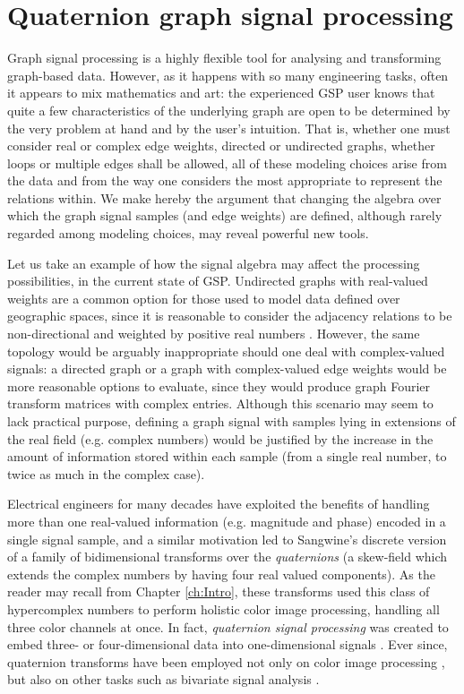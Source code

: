 \chapter{Quaternion graph signal processing}
\label{ch:QGSP}

Graph signal processing is a highly flexible tool for analysing and transforming graph-based data. However, as it happens with so many engineering tasks, often it appears to mix mathematics and art: the experienced GSP user knows that quite a few characteristics of the underlying graph are open to be determined by the very problem at hand and by the user's intuition. That is, whether one must consider real or complex edge weights, directed or undirected graphs, whether loops or multiple edges shall be allowed, all of these modeling choices arise from the data and from the way one considers the most appropriate to represent the relations within. We make hereby the argument that changing the algebra over which the graph signal samples (and edge weights) are defined, although rarely regarded among modeling choices, may reveal powerful new tools.

Let us take an example of how the signal algebra may affect the processing possibilities, in the current state of GSP. Undirected graphs with real-valued weights are a common option for those used to model data defined over geographic spaces, since it is reasonable to consider the adjacency relations to be non-directional and weighted by positive real numbers \cite{shuman2013emerging}. However, the same topology would be arguably inappropriate should one deal with complex-valued signals: a directed graph or a graph with complex-valued edge weights would be more reasonable options to evaluate, since they would produce graph Fourier transform matrices with complex entries. Although this scenario may seem to lack practical purpose, defining a graph signal with samples lying in extensions of the real field (e.g. complex numbers) would be justified by the increase in the amount of information stored within each sample (from a single real number, to twice as much in the complex case).

Electrical engineers for many decades have exploited the benefits of handling more than one real-valued information (e.g. magnitude and phase) encoded in a single signal sample, and a similar motivation led to Sangwine's \cite{sangwine1996fourier} discrete version of a family of bidimensional transforms over the \textit{quaternions} (a skew-field which extends the complex numbers by having four real valued components). As the reader may recall from Chapter \ref{ch:Intro}, these transforms used this class of hypercomplex numbers to perform holistic color image processing, handling all three color channels at once. In fact, \emph{quaternion signal processing} was created to embed three- or four-dimensional data into one-dimensional signals \cite{took2008quaternion}. Ever since, quaternion transforms have been employed not only on color image processing \cite{ell2007hypercomplex,chen2018quaternion,li2013quaternion,evans2000hypercomplex}, but also on other tasks such as bivariate signal analysis \cite{flamant2017spectral,flamant2017time,flamant2018complete}.

